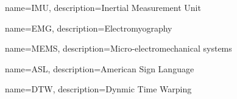 
{
    name=IMU,
    description={Inertial Measurement Unit}
} 
 
 
{
    name=EMG,
    description={Electromyography}
}

{
    name=MEMS,
    description={Micro-electromechanical systems}
}

{
    name=ASL,
    description={American Sign Language}
}

{
    name=DTW,
    description={Dynmic Time Warping}
}